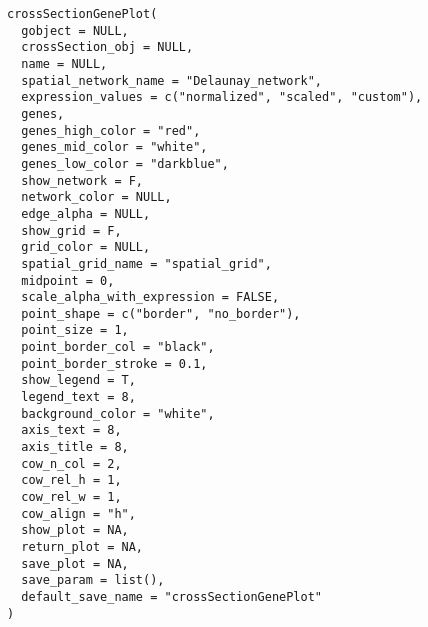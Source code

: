\documentclass[a4paper]{book}
\begin{document}
%
\begin{Usage}
\begin{verbatim}
crossSectionGenePlot(
  gobject = NULL,
  crossSection_obj = NULL,
  name = NULL,
  spatial_network_name = "Delaunay_network",
  expression_values = c("normalized", "scaled", "custom"),
  genes,
  genes_high_color = "red",
  genes_mid_color = "white",
  genes_low_color = "darkblue",
  show_network = F,
  network_color = NULL,
  edge_alpha = NULL,
  show_grid = F,
  grid_color = NULL,
  spatial_grid_name = "spatial_grid",
  midpoint = 0,
  scale_alpha_with_expression = FALSE,
  point_shape = c("border", "no_border"),
  point_size = 1,
  point_border_col = "black",
  point_border_stroke = 0.1,
  show_legend = T,
  legend_text = 8,
  background_color = "white",
  axis_text = 8,
  axis_title = 8,
  cow_n_col = 2,
  cow_rel_h = 1,
  cow_rel_w = 1,
  cow_align = "h",
  show_plot = NA,
  return_plot = NA,
  save_plot = NA,
  save_param = list(),
  default_save_name = "crossSectionGenePlot"
)
\end{verbatim}
\end{Usage}
%
\end{document}
